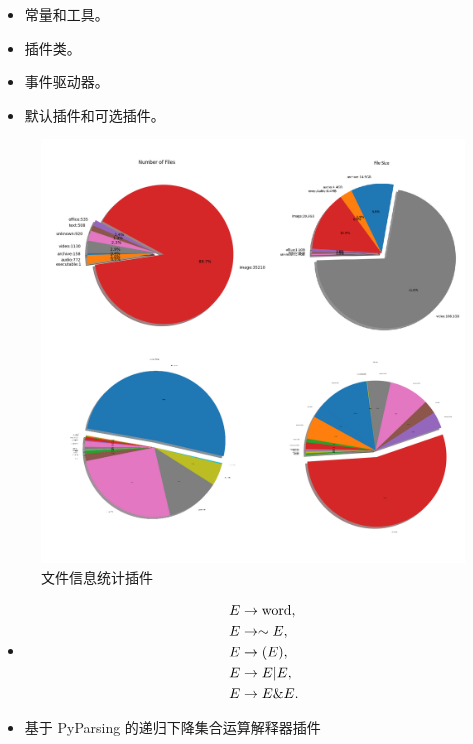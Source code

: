 \documentclass{beamer}
\begin{document}
\begin{frame}
    \begin{itemize}[<+-| alert@+>]
        \item 常量和工具。
        \item 插件类。
        \item 事件驱动器。
        \item 默认插件和可选插件。
    \end{itemize}
\end{frame}

\begin{frame}
    \begin{figure}[h]
        \centering
        \includegraphics[height=.7\textheight]{pic/pie4.png}
        \caption{文件信息统计插件}
    \end{figure}
\end{frame}

\begin{frame}
    \begin{itemize}
        \item\begin{equation*}
            \begin{aligned}
                E &\to {\rm word},\\
                E &\to \sim E,\\
                E &\to (E),\\
                E &\to E | E,\\
                E &\to E \& E.\\
            \end{aligned}
        \end{equation*}
        \item 基于 PyParsing 的递归下降集合运算解释器插件
    \end{itemize}
\end{frame}
\end{document}
